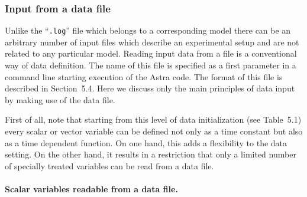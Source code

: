 \subsubsection{Input from a data file}

Unlike the ``{\tt .log}'' file which belongs to a corresponding model
there can be an arbitrary number of input files which describe an
experimental setup and are not related to any particular model.
Reading input data from a file is a conventional way of data definition. 
The name of this file is specified as a first parameter
in a command line starting execution of the Astra code.
The format of this file is described in Section~5.4. 
Here we discuss only the main principles of data input by making
use of the data file.

First of all, note that starting from this level of data initialization
(see Table~5.1) every scalar or vector variable can be defined not only
as a time constant but also as a time dependent function.
On one hand, this adds a flexibility to the data setting. 
On the other hand, it results in a restriction that only a limited
number of specially treated variables can be read from a data file. 

\paragraph{Scalar variables readable from a data file.}

